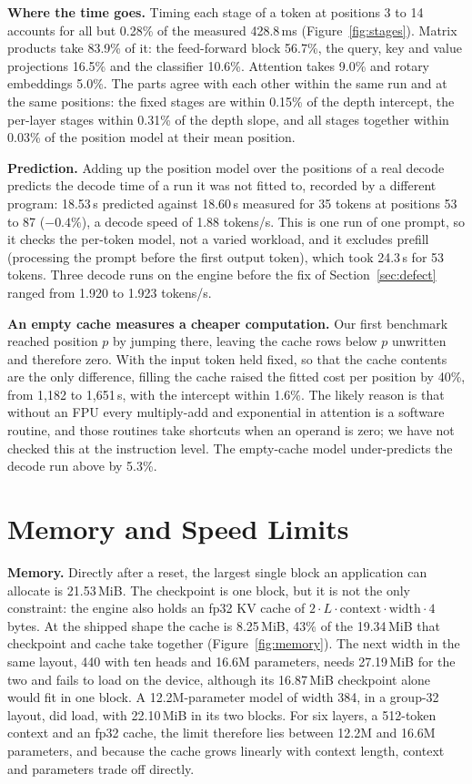 \documentclass[10pt]{article}
\begin{document}
\textbf{Where the time goes.} Timing each stage of a token at positions 3 to 14 accounts for all but
0.28\% of the measured 428.8\,ms (Figure~\ref{fig:stages}). Matrix products take 83.9\% of it: the
feed-forward block 56.7\%, the query, key and value projections 16.5\% and the classifier 10.6\%.
Attention takes 9.0\% and rotary embeddings 5.0\%. The parts agree with each other within the same
run and at the same positions: the fixed stages are within 0.15\% of the depth intercept, the
per-layer stages within 0.31\% of the depth slope, and all stages together within 0.03\% of the
position model at their mean position.

\textbf{Prediction.} Adding up the position model over the positions of a real decode predicts the
decode time of a run it was not fitted to, recorded by a different program: 18.53\,s predicted
against 18.60\,s measured for 35 tokens at positions 53 to 87 ($-0.4\%$), a decode speed of 1.88
tokens/s. This is one run of one prompt, so it checks the per-token model, not a varied workload,
and it excludes prefill (processing the prompt before the first output token), which took 24.3\,s
for 53 tokens. Three decode runs on the engine before the fix of Section~\ref{sec:defect} ranged
from 1.920 to 1.923 tokens/s.

\textbf{An empty cache measures a cheaper computation.} Our first benchmark reached position $p$ by
jumping there, leaving the cache rows below $p$ unwritten and therefore zero. With the input token
held fixed, so that the cache contents are the only difference, filling the cache raised the fitted
cost per position by 40\%, from 1,182 to 1,651\,\textmu s, with the intercept within 1.6\%. The likely
reason is that without an FPU every multiply-add and exponential in attention is a software routine,
and those routines take shortcuts when an operand is zero; we have not checked this at the instruction
level. The empty-cache model under-predicts the decode run above by 5.3\%.

\section{Memory and Speed Limits}
\label{sec:frontier}

\textbf{Memory.} Directly after a reset, the largest single block an application can allocate is
21.53\,MiB. The checkpoint is one block, but it is not the only constraint: the engine also holds an
fp32 KV cache of $2 \cdot L \cdot \mathrm{context} \cdot \mathrm{width} \cdot 4$ bytes. At the
shipped shape the cache is 8.25\,MiB, 43\% of the 19.34\,MiB that checkpoint and cache take together
(Figure~\ref{fig:memory}). The next width in the same layout, 440 with ten heads and 16.6M parameters,
needs 27.19\,MiB for the two and fails to load on the device, although its 16.87\,MiB checkpoint alone
would fit in one block. A 12.2M-parameter model of width 384, in a group-32 layout, did load, with
22.10\,MiB in its two blocks. For six layers, a 512-token context and an fp32 cache, the limit
therefore lies between 12.2M and 16.6M parameters, and because the cache grows linearly with context
length, context and parameters trade off directly.
\end{document}
